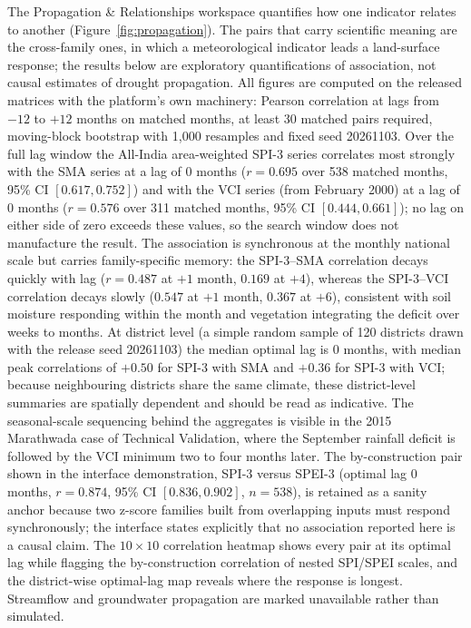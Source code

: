 \documentclass[10pt,a4paper]{article}
\begin{document}
The Propagation \& Relationships workspace quantifies how one indicator relates to another (Figure~\ref{fig:propagation}). The pairs that carry scientific meaning are the cross-family ones, in which a meteorological indicator leads a land-surface response; the results below are exploratory quantifications of association, not causal estimates of drought propagation. All figures are computed on the released matrices with the platform's own machinery: Pearson correlation at lags from $-12$ to $+12$ months on matched months, at least 30 matched pairs required, moving-block bootstrap with 1{,}000 resamples and fixed seed 20261103. Over the full lag window the All-India area-weighted SPI-3 series correlates most strongly with the SMA series at a lag of 0 months ($r=0.695$ over 538 matched months, 95\% CI $[0.617, 0.752]$) and with the VCI series (from February 2000) at a lag of 0 months ($r=0.576$ over 311 matched months, 95\% CI $[0.444, 0.661]$); no lag on either side of zero exceeds these values, so the search window does not manufacture the result. The association is synchronous at the monthly national scale but carries family-specific memory: the SPI-3--SMA correlation decays quickly with lag ($r=0.487$ at $+1$ month, $0.169$ at $+4$), whereas the SPI-3--VCI correlation decays slowly ($0.547$ at $+1$ month, $0.367$ at $+6$), consistent with soil moisture responding within the month and vegetation integrating the deficit over weeks to months. At district level (a simple random sample of 120 districts drawn with the release seed 20261103) the median optimal lag is 0 months, with median peak correlations of $+0.50$ for SPI-3 with SMA and $+0.36$ for SPI-3 with VCI; because neighbouring districts share the same climate, these district-level summaries are spatially dependent and should be read as indicative. The seasonal-scale sequencing behind the aggregates is visible in the 2015 Marathwada case of Technical Validation, where the September rainfall deficit is followed by the VCI minimum two to four months later. The by-construction pair shown in the interface demonstration, SPI-3 versus SPEI-3 (optimal lag 0 months, $r=0.874$, 95\% CI $[0.836, 0.902]$, $n=538$), is retained as a sanity anchor because two z-score families built from overlapping inputs must respond synchronously; the interface states explicitly that no association reported here is a causal claim. The $10\times10$ correlation heatmap shows every pair at its optimal lag while flagging the by-construction correlation of nested SPI/SPEI scales, and the district-wise optimal-lag map reveals where the response is longest. Streamflow and groundwater propagation are marked unavailable rather than simulated.
\end{document}
